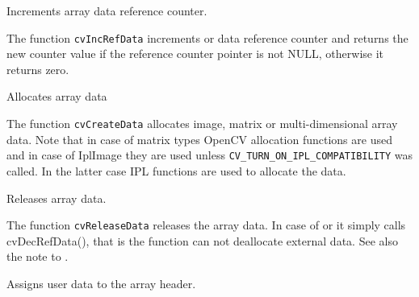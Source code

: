 
\label{IncRefData}

Increments array data reference counter.


\begin{description}
\end{description}


The function \texttt{cvIncRefData} increments  or
 data reference counter and returns the new counter value
if the reference counter pointer is not NULL, otherwise it returns zero.

\label{CreateData}

Allocates array data


\begin{description}
\end{description}


The function \texttt{cvCreateData} allocates image, matrix or
multi-dimensional array data. Note that in case of matrix types OpenCV
allocation functions are used and in case of IplImage they are used
unless \texttt{CV\_TURN\_ON\_IPL\_COMPATIBILITY} was called. In the
latter case IPL functions are used to allocate the data.

\label{ReleaseData}

Releases array data.


\begin{description}
\end{description}


The function \texttt{cvReleaseData} releases the array data. In case of  or  it simply calls cvDecRefData(), that is the function can not deallocate external data. See also the note to .

\label{SetData}

Assigns user data to the array header.

